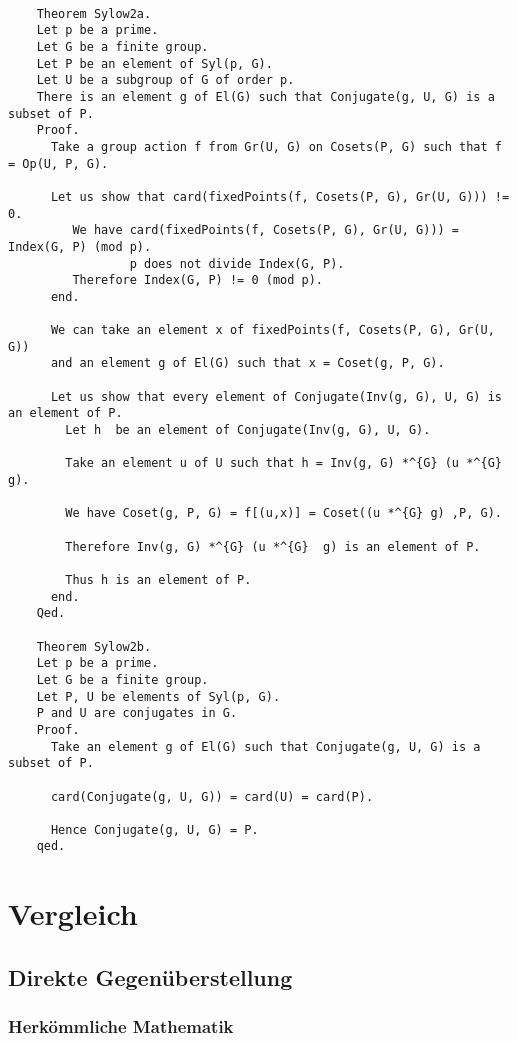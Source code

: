 \documentclass[a4paper,12pt]{scrartcl}
\begin{document}
\begin{lstlisting}
	
	Theorem Sylow2a.
	Let p be a prime.
	Let G be a finite group.
	Let P be an element of Syl(p, G).
	Let U be a subgroup of G of order p.
	There is an element g of El(G) such that Conjugate(g, U, G) is a subset of P.
	Proof.
	  Take a group action f from Gr(U, G) on Cosets(P, G) such that f = Op(U, P, G).
	  
	  Let us show that card(fixedPoints(f, Cosets(P, G), Gr(U, G))) !=  0.
		 We have card(fixedPoints(f, Cosets(P, G), Gr(U, G))) = Index(G, P) (mod p).
				 p does not divide Index(G, P).
		 Therefore Index(G, P) != 0 (mod p).
	  end.
	  
	  We can take an element x of fixedPoints(f, Cosets(P, G), Gr(U, G))
	  and an element g of El(G) such that x = Coset(g, P, G).
	  
	  Let us show that every element of Conjugate(Inv(g, G), U, G) is an element of P.
		Let h  be an element of Conjugate(Inv(g, G), U, G).
	
		Take an element u of U such that h = Inv(g, G) *^{G} (u *^{G}  g).
	
		We have Coset(g, P, G) = f[(u,x)] = Coset((u *^{G} g) ,P, G).
	
		Therefore Inv(g, G) *^{G} (u *^{G}  g) is an element of P.
	
		Thus h is an element of P.
	  end.
	Qed.
	
	Theorem Sylow2b.
	Let p be a prime.
	Let G be a finite group.
	Let P, U be elements of Syl(p, G).
	P and U are conjugates in G.
	Proof.
	  Take an element g of El(G) such that Conjugate(g, U, G) is a subset of P.
	
	  card(Conjugate(g, U, G)) = card(U) = card(P).
	
	  Hence Conjugate(g, U, G) = P.
	qed.
\end{lstlisting}


\newpage

\section{Vergleich}

\subsection{Direkte Gegenüberstellung}

\subsubsection{Herkömmliche Mathematik}
\end{document}
